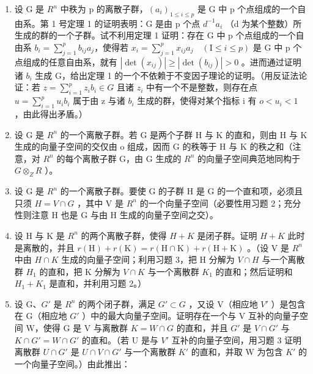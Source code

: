 \ExerciseGroupsStart
\ExerciseSection

\begin{enumerate}
\def\labelenumi{\arabic{enumi})}
\item
  设 G 是 \(R^{n}\) 中秩为 p 的离散子群，\((a_{i})_{1\leqslant i\leqslant p}\) 是 G 中 p 个点组成的一个自由系。第 1 号定理 1 的证明表明：G 是由 p 个点 \(d^{-1}a_{i}\) （d 为某个整数）所生成的群的一个子群。试不利用定理 1 证明：存在 G 中 p 个点组成的一个自由系 \(b_{i}=\sum_{j=1}^{p}b_{ij}a_{j}\)，使得若 \(x_{i}=\sum_{j=1}^{p}x_{ij}a_{j}\quad(\mathrm{I}\leqslant i\leqslant p)\) 是 G 中 p 个点组成的任意自由系，就有 \(|\det(x_{ij})|\geqslant|\det(b_{ij})|>0\) 。进而通过证明诸 \(b_{i}\) 生成 G，给出定理 1 的一个不依赖于不变因子理论的证明。（用反证法论证：若 \(z=\sum_{i=1}^{p}z_{i}b_{i}\in G\) 且诸 \(z_{i}\) 中有一个不是整数，则存在点 \(u=\sum_{i=1}^{p}u_{i}b_{i}\) 属于由 z 与诸 \(b_{i}\) 生成的群，使得对某个指标 i 有 \(o<u_{i}<1\) ，由此得出矛盾。）
\item
  设 G 是 \(R^{n}\) 的一个离散子群。若 G 是两个子群 H 与 K 的直和，则由 H 与 K 生成的向量子空间的交仅由 o 组成，因而 G 的秩等于 H 与 K 的秩之和（注意，对 \(R^{n}\) 的每个离散子群 G，由 G 生成的 \(R^{n}\) 的向量子空间典范地同构于 \(G \otimes_{Z} R\) ）。
\item
  设 G 是 \(R^{n}\) 的一个离散子群。要使 G 的子群 H 是 G 的一个直和项，必须且只须 \(H = V \cap G\) ，其中 V 是 \(R^{n}\) 的一个向量子空间（必要性用习题 2；充分性则注意 H 也是 G 与由 H 生成的向量子空间之交）。
\item
  设 H 与 K 是 \(R^{n}\) 的两个离散子群，使得 \(H + K\) 是闭子群。证明 \(H + K\) 此时是离散的，并且 \(r(\mathrm{H}) + r(\mathrm{K}) = r(\mathrm{H} \cap \mathrm{K}) + r(\mathrm{H} + \mathrm{K})\) 。（设 V 是 \(R^{n}\) 中由 \(H \cap K\) 生成的向量子空间；利用习题 3，把 H 分解为 \(V \cap H\) 与一个离散群 \(H_{1}\) 的直和，把 K 分解为 \(V \cap K\) 与一个离散群 \(K_{1}\) 的直和；然后证明和 \(H_{1} + K_{1}\) 是直和，并利用习题 2。）
\item
  设 G、\(G'\) 是 \(R^{n}\) 的两个闭子群，满足 \(G' \subset G\) ，又设 V（相应地 \(V'\) ）是包含在 G（相应地 \(G'\) ）中的最大向量子空间。证明存在一个与 V 互补的向量子空间 W，使得 G 是 V 与离散群 \(K = W \cap G\) 的直和，并且 \(G'\) 是 \(V \cap G'\) 与 \(K \cap G' = W \cap G'\) 的直和。（若 U 是与 \(V'\) 互补的向量子空间，用习题 3 证明离散群 \(U \cap G'\) 是 \(U \cap V \cap G'\) 与一个离散群 \(K'\) 的直和，并取 W 为包含 \(K'\) 的一个向量子空间。）由此推出：
\end{enumerate}

